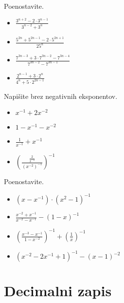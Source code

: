         
            \begin{naloga}
                Poenostavite.
                \begin{itemize}
                    \item $\frac{3^{n+2}-2\cdot 3^{n-1}}{3^{n-2}+3^n}$ 
                    \item $\frac{5^{2n}+5^{2n-1}-2\cdot 5^{2n+1}}{25^n}$ 
                    \item $\frac{7^{3n-3}+3\cdot 7^{3n-2}-7^{3n-4}}{7^{3n-2}-7^{3n-1}}$ 
                    \item $\frac{2^{n-1}+3\cdot 2^n}{4^n+5\cdot 2^{2n-1}}$ 
                \end{itemize}
            \end{naloga}


            \begin{naloga}
                Napišite brez negativnih eksponentov.
                \begin{itemize}
                    \item $x^{-1}+2x^{-2}$ 
                    \item $1-x^{-1}-x^{-2}$ 
                    \item $\frac{1}{x^{-1}}+x^{-1}$ 
                    \item $\left(\frac{\frac{2}{x^{-2}}}{\left(x^{-2}\right)^{-1}}\right)^{-1}$ 
                \end{itemize}
            \end{naloga}
        

            \begin{naloga}
                Poenostavite.
                \begin{itemize}
                    \item $\left(x-x^{-1}\right)\cdot\left(x^2-1\right)^{-1}$ 
                    \item $\frac{x^{-2}+x^{-1}}{x^{-2}-x^{-1}}-\left(1-x\right)^{-1}$ 
                    \item $\left(\frac{x^{-3}-x^{-1}}{1-x^{-2}}\right)^{-1}+\left(\frac{1}{x}\right)^{-1}$ 
                    \item $\left(x^{-2}-2x^{-1}+1\right)^{-1}-\left(x-1\right)^{-2}$ 
                \end{itemize}
            \end{naloga}


\newpage

\section{Decimalni zapis}

